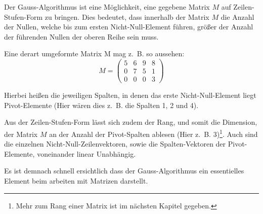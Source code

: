 Der Gauss-Algorithmus ist eine Möglichkeit, eine gegebene Matrix $M$ auf Zeilen-Stufen-Form zu bringen.
Dies bedeutet, dass innerhalb der Matrix $M$ die Anzahl der Nullen, welche bis zum ersten Nicht-Null-Element führen, größer der Anzahl der führenden Nullen der oberen Reihe sein muss.

Eine derart umgeformte Matrix M mag z.~B. so aussehen:
\[ M = \begin{pmatrix}
5 & 6 & 9 & 8\\ 
0 & 7 & 5 & 1\\ 
0 & 0 & 0 & 3
\end{pmatrix} \]

Hierbei heißen die jeweiligen Spalten, in denen das erste Nicht-Null-Element liegt Pivot-Elemente (Hier wären dies z.~B. die Spalten 1, 2 und 4).

Aus der Zeilen-Stufen-Form lässt sich zudem der Rang, und somit die Dimension, der Matrix $M$ an der Anzahl der Pivot-Spalten ablesen (Hier z.~B. 3)\footnote{Mehr zum Rang einer Matrix ist im nächsten Kapitel gegeben.}.
Auch sind die einzelnen Nicht-Null-Zeilenvektoren, sowie die Spalten-Vektoren der Pivot-Elemente, voneinander linear Unabhängig.

Es ist demnach schnell ersichtlich dass der Gauss-Algorithmus ein essentielles Element beim arbeiten mit Matrizen darstellt.
